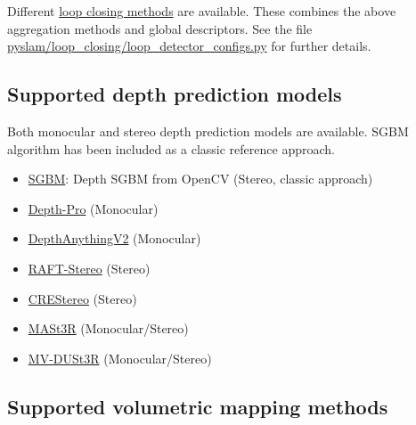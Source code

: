 \documentclass{article}
\providecommand{\tightlist}{%
  \setlength{\itemsep}{0pt}\setlength{\parskip}{0pt}}
\begin{document}
Different \protect\hyperlink{loop-closing}{loop closing methods} are
available. These combines the above aggregation methods and global
descriptors. See the file \href{https://github.com/luigifreda/pyslam/blob/master/pyslam/loop_closing/loop_detector_configs.py}{pyslam/loop\_closing/loop\_detector\_configs.py}
for further details.

\hypertarget{supported-depth-prediction-models}{%
\subsection{Supported depth prediction
models}\label{supported-depth-prediction-models}}

Both monocular and stereo depth prediction models are available. SGBM
algorithm has been included as a classic reference approach.

\begin{itemize}
\tightlist
\item
  \href{https://ieeexplore.ieee.org/document/4359315}{SGBM}\cite{hirschmuller2007stereo}: Depth SGBM
  from OpenCV (Stereo, classic approach) 
\item
  \href{https://arxiv.org/abs/2410.02073}{Depth-Pro} (Monocular) \cite{depthpro2023}
\item
  \href{https://arxiv.org/abs/2406.09414}{DepthAnythingV2} (Monocular) \cite{depthanythingv2_2024}
\item
  \href{https://arxiv.org/abs/2109.07547}{RAFT-Stereo} (Stereo) \cite{teed2021raft}
\item
  \href{https://arxiv.org/abs/2203.11483}{CREStereo} (Stereo) \cite{li2022cres}
\item
  \href{https://arxiv.org/abs/2406.09756}{MASt3R} (Monocular/Stereo) \cite{master}
\item
  \href{https://arxiv.org/abs/2412.06974}{MV-DUSt3R} (Monocular/Stereo) \cite{mvduster}    
\end{itemize}

\hypertarget{supported-volumetric-mapping-methods}{%
\subsection{Supported volumetric mapping
methods}\label{supported-volumetric-mapping-methods}}
\end{document}
